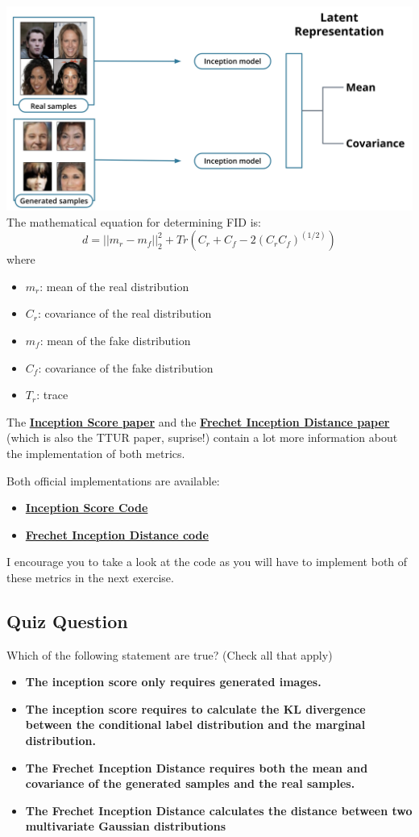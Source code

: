 \includegraphics[width=0.75\linewidth]{img//genAdvNet//deepGAN/screen-shot-2022-05-11-at-4.30.32-pm.jpeg}
The mathematical equation for determining FID is: \[d = ||m_r - m_f||_{2}^{2} + Tr(C_r + C_f -2(C_r C_f)^{(1/2)})\]
where
\begin{itemize}
    \item \(m_r\): mean of the real distribution
    \item \(C_r\): covariance of the real distribution
    \item \(m_f\): mean of the fake distribution
    \item \(C_f\): covariance of the fake distribution
    \item \(T_r\): trace
\end{itemize}
The \href{https://arxiv.org/pdf/1606.03498.pdf}{\textbf{Inception Score paper}} and the \href{https://arxiv.org/pdf/1706.08500.pdf}{\textbf{Frechet Inception Distance paper}} (which is also the TTUR paper, suprise!) contain a lot more information about the implementation of both metrics. \newline

Both official implementations are available:
\begin{itemize}
    \item \href{https://github.com/openai/improved-gan}{\textbf{Inception Score Code}}
    \item \href{https://github.com/bioinf-jku/TTUR}{\textbf{Frechet Inception Distance code}}
\end{itemize}
I encourage you to take a look at the code as you will have to implement both of these metrics in the next exercise.

\subsection{Quiz Question}

Which of the following statement are true? (Check all that apply)
\begin{itemize}
    \item \textbf{The inception score only requires generated images.}
    \item \textbf{The inception score requires to calculate the KL divergence between the conditional label distribution and the marginal distribution.}
    \item \textbf{The Frechet Inception Distance requires both the mean and covariance of the generated samples and the real samples.}
    \item \textbf{The Frechet Inception Distance calculates the distance between two multivariate Gaussian distributions}
\end{itemize}


